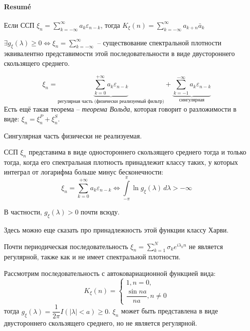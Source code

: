 \paragraph{Resum\'e}

Если ССП $\xi_n = \sum_{k=-\infty}^\infty a_k \varepsilon_{n-k}$,
тогда $K_\xi(n) = \sum_{k=-\infty}^\infty a_{k+n} \bar{a}_k$


$\exists g_\xi(\lambda) \geqslant 0 \Leftrightarrow \xi_n = \sum_{k=-\infty}^\infty$ -- 
существование спектральной плотности эквивалентно представимости этой последовательности в 
виде двустороннего скользящего среднего.

\[
  \xi_n = \underbrace{\sum_{k=0}^{+\infty} a_k \varepsilon_{n-k}}_\text{регулярная часть (физически реализуемый фильтр)} 
  + 
  \underbrace{\sum_{k=-1}^{-\infty} a_k \varepsilon_{n-k}}_\text{сингулярная}
\]
Есть ещё такая теорема --
\emph{теорема Вольда}, которая говорит о разложимости в виде: $\xi_n = \xi_n^P + \xi_n^S$.

Сингулярная часть физически не реализуемая.

\begin{theorem}[Колмогорова]
  ССП $\xi_n$ представима в виде одностороннего скользящего среднего тогда и только тогда, когда
  его спектральная плотность принадлежит классу таких, у которых интеграл от логарифма больше 
  минус бесконечности:
  \[
    \xi_n = \sum_{k=0}^{+\infty} a_k \varepsilon_{n-k} \Leftrightarrow
    \int\limits_{-\pi}^\pi \ln g_\xi(\lambda) \, d\lambda > -\infty
  \]

  В частности, $g_\xi(\lambda) > 0$ почти всюду.

  Здесь можно еще сказать про принадлежность этой функции классу Харви.
\end{theorem}

\begin{remark}
  Почти периодическая последовательность $\xi_n = \sum_{k=1}^N \sigma_k e^{i\lambda_k n}$
  не является регулярной, также как и не имеет спектральной плотности.
\end{remark}

\begin{remark}
  Рассмотрим последовательность с автоковариационной функцией вида:
  \[
    K_\xi(n) = \begin{cases}
      1, n = 0, \\
      \dfrac{\sin na}{na}, n\neq 0
    \end{cases}
  \]
  тогда $g_\xi(\lambda) = \dfrac{1}{2\pi} I(|\lambda| < a) \geqslant 0$.
  $\xi_n$ может быть представлена в виде двустороннего скользящего среднего, но
  не является регулярной.
\end{remark}

